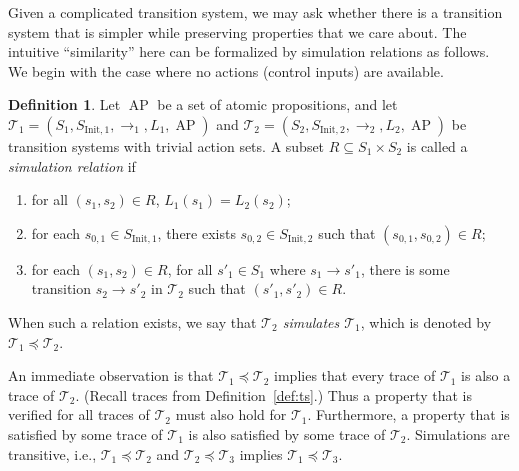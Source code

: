 \documentclass{amsart}
\DeclareMathOperator{\ap}{AP}
\theoremstyle{plain}
\theoremstyle{definition}
\newtheorem{defn}{Definition}
\theoremstyle{definition}
\begin{document}
Given a complicated transition system, we may ask whether there is a transition
system that is simpler while preserving properties that we care about.  The
intuitive ``similarity'' here can be formalized by simulation relations as
follows.  We begin with the case where no actions (control inputs) are available.
\begin{defn}
Let $\ap$ be a set of atomic propositions, and let $\mathcal{T}_1=(S_1, S_{\mathrm{Init},1}, \longrightarrow_1, L_1 , \ap )$ and $\mathcal{T}_2=(S_2 , S_{\mathrm{Init},2}, \longrightarrow_2 , L_2 , \ap )$ be transition systems with trivial action sets.  A subset $R\subseteq S_{1}\times S_{2}$ is called a \textit{simulation relation} if
\begin{enumerate}
\item for all $(s_1, s_2)\in R$, $L_{1}(s_{1})=L_{2}(s_{2})$;
\item for each $s_{0,1} \in S_{\mathrm{Init},1}$, there exists $s_{0,2} \in S_{\mathrm{Init},2}$ such that $\left( s_{0,1}, s_{0,2} \right) \in R$;
\item for each $(s_1, s_2)\in R$, for all $s'_1 \in S_1$ where $s_{1}\longrightarrow s'_{1}$, there is some transition $s_{2}\longrightarrow s'_{2}$ in $\mathcal{T}_2$ such that $(s'_{1}, s'_{2})\in R$.
\end{enumerate}
When such a relation exists, we say that \textit{$\mathcal{T}_2$ simulates $\mathcal{T}_1$}, which is denoted by $\mathcal{T}_1 \preceq \mathcal{T}_2$.
\end{defn}
An immediate observation is that $\mathcal{T}_1 \preceq \mathcal{T}_2$ implies that every trace of
$\mathcal{T}_1$ is also a trace of $\mathcal{T}_2$.  (Recall traces from Definition~\ref{def:ts}.)
Thus a property that is verified for all traces of $\mathcal{T}_2$ must also hold for
$\mathcal{T}_1$.  Furthermore, a property that is satisfied by some trace of $\mathcal{T}_1$ is also
satisfied by some trace of $\mathcal{T}_2$.  Simulations are transitive, i.e., $\mathcal{T}_1
\preceq \mathcal{T}_2$ and $\mathcal{T}_2 \preceq \mathcal{T}_3$ implies $\mathcal{T}_1 \preceq \mathcal{T}_3$.

\end{document}
